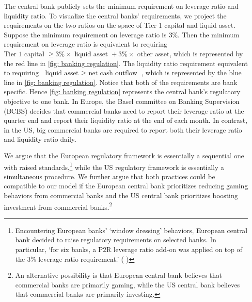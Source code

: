 The central bank publicly sets the minimum requirement on leverage ratio and liquidity ratio. To visualize the central banks' requirements, we project the requirements on the two ratios on the space of Tier 1 capital and liquid asset. 
Suppose the minimum requirement on leverage ratio is $3\%$. 
Then the minimum requirement on leverage ratio is equivalent to requiring $\text{Tier 1 capital }\geq 3\% \times \text{ liquid asset } + 3\% \times\text{ other asset}$, which is represented by the red line in \cref{fig: banking regulation}.
The liquidity ratio requirement equivalent to requiring $\text{ liquid asset }\geq \text{ net cash outflow }$, which is represented by the blue line in \cref{fig: banking regulation}.
Notice that both of the requirements are bank specific.
Hence \cref{fig: banking regulation} represents the central bank's regulatory objective to one bank.
In Europe, the Basel committee on Banking Supervision (BCBS) decides that commercial banks need to report their leverage ratio at the quarter end and report their liquidity ratio at the end of each month.
In contrast, in the US, big commercial banks are required to report both their leverage ratio and liquidity ratio daily.

We argue that 
the European regulatory framework is essentially a sequential one with raised standards,\footnote{Encountering European banks' `window dressing' behaviors, European central bank decided to raise regulatory requirements on selected banks. In particular, `for six banks, a P2R leverage ratio add-on was applied on top of the 3\% leverage ratio requirement.' ( \citet{ECBraiserequirement})} while the 
US regulatory framework is essentially a simultaneous procedure. 
We further argue that both practices could be compatible to our model if the European central bank prioritizes reducing gaming behaviors from commercial banks and the US central bank prioritizes boosting investment from commercial banks.\footnote{An alternative possibility is that European central bank believes that  commercial banks are primarily  gaming, while the US central bank believes that  commercial banks are primarily investing.} 



